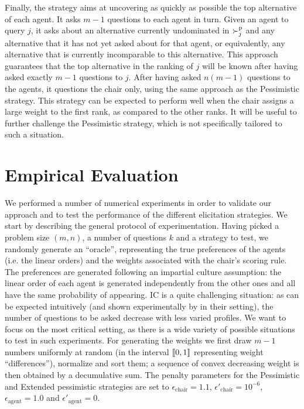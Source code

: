 \documentclass{article}
\begin{document}
Finally, the  strategy aims at uncovering as quickly as possible the top alternative of each agent. It asks $m - 1$ questions to each agent in turn. 
Given an agent to query $j$, it asks about an alternative currently undominated in $\succ^\text{p}_j$ and any alternative that it has not yet asked about for that agent, or equivalently, any alternative that is currently incomparable to this alternative. This approach guarantees that the top alternative in the ranking of $j$ will be known after having asked exactly $m-1$ questions to $j$.
After having asked $n (m-1)$ questions to the agents, it questions the chair only, using the same approach as the Pessimistic strategy.
This strategy can be expected to perform well when the chair assigns a large weight to the first rank, as compared to the other ranks. It will be useful to further challenge the Pessimistic strategy, which is not specifically tailored to such a situation.


\section{Empirical Evaluation} 
\label{sec:experiments}
We  performed a number of numerical experiments in order to validate our approach and to test the performance of the different elicitation strategies. %
We start by describing the general protocol of experimentation. %
Having picked a problem size $(m, n)$, a number of questions $k$ and a strategy to test, we randomly generate an “oracle”, representing the true preferences of the agents (i.e. the linear orders) and the weights associated with the chair's scoring rule. 
The preferences are generated following an impartial culture assumption: the linear order of each agent is generated independently from the other ones and all have the same probability of appearing. IC is a quite challenging situation: as can be expected intuitively (and shown experimentally by \citet{Lu2011} in their setting), the number of questions to be asked decrease with less varied profiles. We want to focus on the most critical setting, as there is a wide variety of possible situations to test in such experiments.
For generating the weights we first draw $m - 1$ numbers uniformly at random (in the interval $\llbracket 0,1 \rrbracket$ representing weight ``differences''), normalize and sort them; 
a sequence of convex decreasing weight is then obtained by a decumulative sum.
The penalty parameters for the Pessimistic and Extended pessimistic strategies are set to $\epsilon_{\text{chair}} = 1.1$, $\epsilon'_{\text{chair}} = 10^{-6}$, $\epsilon_{\text{agent}} = 1.0$ and $\epsilon'_{\text{agent}} = 0$.
\end{document}
